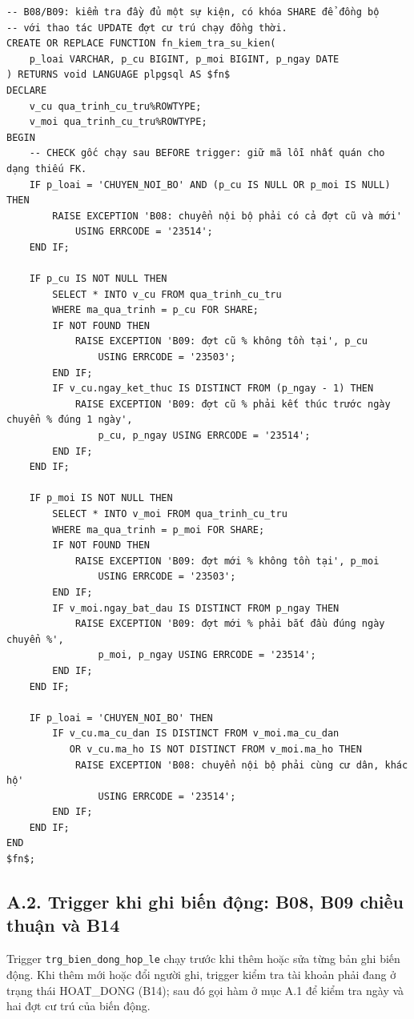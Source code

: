 \begin{lstlisting}[style=sqlvn, caption={Hàm kiểm tra một biến động (B08, B09)}, label={lst:pl_kiemtra}]
-- B08/B09: kiểm tra đầy đủ một sự kiện, có khóa SHARE để đồng bộ
-- với thao tác UPDATE đợt cư trú chạy đồng thời.
CREATE OR REPLACE FUNCTION fn_kiem_tra_su_kien(
    p_loai VARCHAR, p_cu BIGINT, p_moi BIGINT, p_ngay DATE
) RETURNS void LANGUAGE plpgsql AS $fn$
DECLARE
    v_cu qua_trinh_cu_tru%ROWTYPE;
    v_moi qua_trinh_cu_tru%ROWTYPE;
BEGIN
    -- CHECK gốc chạy sau BEFORE trigger: giữ mã lỗi nhất quán cho dạng thiếu FK.
    IF p_loai = 'CHUYEN_NOI_BO' AND (p_cu IS NULL OR p_moi IS NULL) THEN
        RAISE EXCEPTION 'B08: chuyển nội bộ phải có cả đợt cũ và mới'
            USING ERRCODE = '23514';
    END IF;

    IF p_cu IS NOT NULL THEN
        SELECT * INTO v_cu FROM qua_trinh_cu_tru
        WHERE ma_qua_trinh = p_cu FOR SHARE;
        IF NOT FOUND THEN
            RAISE EXCEPTION 'B09: đợt cũ % không tồn tại', p_cu
                USING ERRCODE = '23503';
        END IF;
        IF v_cu.ngay_ket_thuc IS DISTINCT FROM (p_ngay - 1) THEN
            RAISE EXCEPTION 'B09: đợt cũ % phải kết thúc trước ngày chuyển % đúng 1 ngày',
                p_cu, p_ngay USING ERRCODE = '23514';
        END IF;
    END IF;

    IF p_moi IS NOT NULL THEN
        SELECT * INTO v_moi FROM qua_trinh_cu_tru
        WHERE ma_qua_trinh = p_moi FOR SHARE;
        IF NOT FOUND THEN
            RAISE EXCEPTION 'B09: đợt mới % không tồn tại', p_moi
                USING ERRCODE = '23503';
        END IF;
        IF v_moi.ngay_bat_dau IS DISTINCT FROM p_ngay THEN
            RAISE EXCEPTION 'B09: đợt mới % phải bắt đầu đúng ngày chuyển %',
                p_moi, p_ngay USING ERRCODE = '23514';
        END IF;
    END IF;

    IF p_loai = 'CHUYEN_NOI_BO' THEN
        IF v_cu.ma_cu_dan IS DISTINCT FROM v_moi.ma_cu_dan
           OR v_cu.ma_ho IS NOT DISTINCT FROM v_moi.ma_ho THEN
            RAISE EXCEPTION 'B08: chuyển nội bộ phải cùng cư dân, khác hộ'
                USING ERRCODE = '23514';
        END IF;
    END IF;
END
$fn$;
\end{lstlisting}

\subsection*{A.2. Trigger khi ghi biến động: B08, B09 chiều thuận và B14}

Trigger \texttt{trg\_bien\_dong\_hop\_le} chạy trước khi thêm hoặc sửa từng bản ghi biến động. Khi thêm mới hoặc đổi người ghi, trigger kiểm tra tài khoản phải đang ở trạng thái HOAT\_DONG (B14); sau đó gọi hàm ở mục A.1 để kiểm tra ngày và hai đợt cư trú của biến động.

